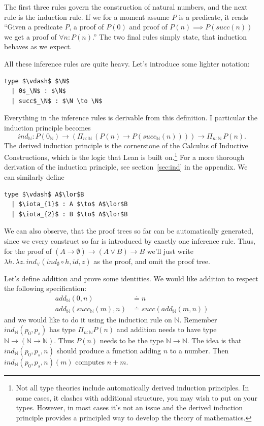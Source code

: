 \documentclass[a4paper, 12pt]{article}
\newcommand{\N}{\mathbb{N}}
\newcommand{\la}[1]{\lambda{#1}.\,}
\theoremstyle{changedot}
\theoremstyle{changedotbreak}
\theoremstyle{nonumberplain}
\begin{document}
The first three rules govern the construction of natural numbers, and the next rule is the induction rule. If we for a moment assume $P$ is a predicate, it reads ``Given a predicate $P$, a proof of $P(0)$ and proof of $P(n) \implies P(succ(n))$ we get a proof of $\forall n: P(n)$.'' The two final rules simply state, that induction behaves as we expect.

All these inference rules are quite heavy. Let's introduce some lighter notation:

\begin{lstlisting}[mathescape=true]
  type $\vdash$ $\N$
  | 0$_\N$ : $\N$
  | succ$_\N$ : $\N \to \N$
\end{lstlisting}

Everything in the inference rules is derivable from this definition. I particular the induction principle becomes \[ind_{\N} : P(0_{\N}) \to (\Pi_{n:\N}\, (P(n) \to P(succ_{\N}(n)))) \to \Pi_{n:\N}\, P(n).\] The derived induction principle is the cornerstone of the Calculus of Inductive Constructions, which is the logic that Lean is built on.\footnote{Not all type theories include automatically derived induction principles. In some cases, it clashes with additional structure, you may wish to put on your types. However, in most cases it's not an issue and the derived induction principle provides a principled way to develop the theory of mathematics.} For a more thorough derivation of the induction principle, see section~\ref{sec:ind} in the appendix. We can similarly define

\begin{lstlisting}[mathescape=true]
  type $\vdash$ A$\lor$B
  | $\iota_{1}$ : A $\to$ A$\lor$B
  | $\iota_{2}$ : B $\to$ A$\lor$B
\end{lstlisting}

We can also observe, that the proof trees so far can be automatically generated, since we every construct so far is introduced by exactly one inference rule. Thus, for the proof of $(A \to \emptyset) \to (A \lor B) \to B$ we'll just write $\la h \la z ind_{\lor}(ind_{\emptyset} \circ h, id, z)$ as the proof, and omit the proof tree.

Let's define addition and prove some identities. We would like addition to respect the following specification:
\begin{align*}
  \mathit{add}_{\N} (0, n) &\doteq n \\
  \mathit{add}_{\N} (succ_{\N}(m), n) &\doteq succ(\mathit{add}_{\N}(m, n))
\end{align*}
and we would like to do it using the induction rule on $\N$. Remember $ind_{\N}(p_{0}, p_{s})$ has type $\Pi_{n:\N} P(n)$ and addition needs to have type $\N \to (\N \to \N)$. Thus $P(n)$ needs to be the type $\N \to \N$. The idea is that $ind_{\N}(p_{0}, p_{s}, n)$ should produce a function adding $n$ to a number. Then $ind_{\N}(p_{0}, p_{s}, n)(m)$ computes $n+m$.
\end{document}

